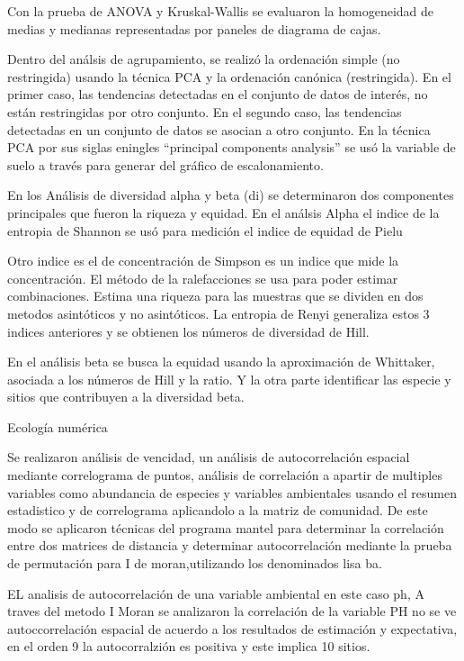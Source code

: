 \documentclass[11pt,]{article}
\begin{document}
Con la prueba de ANOVA y Kruskal-Wallis se evaluaron la homogeneidad de
medias y medianas representadas por paneles de diagrama de cajas.

Dentro del análsis de agrupamiento, se realizó la ordenación simple (no
restringida) usando la técnica PCA y la ordenación canónica
(restringida). En el primer caso, las tendencias detectadas en el
conjunto de datos de interés, no están restringidas por otro conjunto.
En el segundo caso, las tendencias detectadas en un conjunto de datos se
asocian a otro conjunto. En la técnica PCA por sus siglas eningles
``principal components analysis'' se usó la variable de suelo a través
para generar del gráfico de escalonamiento.

En los Análisis de diversidad alpha y beta (di) se determinaron dos
componentes principales que fueron la riqueza y equidad. En el análsis
Alpha el indice de la entropia de Shannon se usó para medición el indice
de equidad de Pielu

Otro indice es el de concentración de Simpson es un indice que mide la
concentración. El método de la ralefacciones se usa para poder estimar
combinaciones. Estima una riqueza para las muestras que se dividen en
dos metodos asintóticos y no asintóticos. La entropia de Renyi
generaliza estos 3 indices anteriores y se obtienen los números de
diversidad de Hill.

En el análisis beta se busca la equidad usando la aproximación de
Whittaker, asociada a los números de Hill y la ratio. Y la otra parte
identificar las especie y sitios que contribuyen a la diversidad beta.

Ecología numérica

Se realizaron análisis de vencidad, un análisis de autocorrelación
espacial mediante correlograma de puntos, análisis de correlación a
apartir de multiples variables como abundancia de especies y variables
ambientales usando el resumen estadistico y de correlograma aplicandolo
a la matriz de comunidad. De este modo se aplicaron técnicas del
programa mantel para determinar la correlación entre dos matrices de
distancia y determinar autocorrelación mediante la prueba de permutación
para I de moran,utilizando los denominados lisa ba.

EL analisis de autocorrelación de una variable ambiental en este caso
ph, A traves del metodo I Moran se analizaron la correlación de la
variable PH no se ve autoccorrelación espacial de acuerdo a los
resultados de estimación y expectativa, en el orden 9 la autocorralzión
es positiva y este implica 10 sitios.
\end{document}
